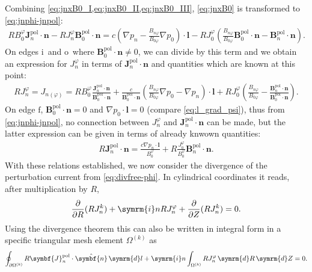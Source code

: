 \documentclass[a4paper, twoside, 10pt, english]{article}
\numberwithin{equation}{section}
\let\temp\varrho
\let\varrho\rho
\let\rho\temp
\let\temp\vartheta
\let\vartheta\theta
\let\theta\temp
\let\temp\varphi
\let\varphi\phi
\let\phi\temp
\let\vec\symbf
\newcommand*\grad{\ensuremath{\nabla}}
\newcommand*\diff{\ensuremath{\symrm{d}}}  %
\newcommand*\im{\ensuremath{\symrm{i}}}  %
\newcommand*\pd[2][]{\ensuremath{\frac{\partial #1}{\partial #2}}}  %
\newcommand*\pol{\ensuremath{\textrm{pol}}}  %
\newcommand*\fs{\ensuremath{\textrm{f}}}  %
\newcommand*\inw{\ensuremath{\textrm{i}}}  %
\newcommand*\out{\ensuremath{\textrm{o}}}  %
\begin{document}
Combining \cref{eq:jnxB0_I,eq:jnxB0_II,eq:jnxB0_III}, \cref{eq:jnxB0} is transformed to \cref{eq:jnphi-jnpol}:
\begin{gather}
  R B_{0}^{\phi} \vec{J}_{n}^{\pol} \cdot \vec{n} - R J_{n}^{\phi} \vec{B}_{0}^{\pol} \cdot \vec{n} = c \left ( \grad p_{n} - \frac{B_{n \phi}}{B_{0 \phi}} \grad p_{0} \right ) \cdot \vec{l} - R J_{0}^{\phi} \left ( \frac{B_{n \phi}}{B_{0 \phi}} \vec{B}_{0}^{\pol} \cdot \vec{n} - \vec{B}_{n}^{\pol} \cdot \vec{n} \right ). \label{eq:jnphi-jnpol}
\end{gather}
On edges \inw\ and \out\ where $\vec{B}_{0}^{\pol} \cdot \vec{n} \neq 0$, we can divide by this term and we obtain an expression for $J_{n}^{\phi}$ in terms of $\vec{J}_{n}^{\pol} \cdot \vec{n}$ and quantities which are known at this point:
\begin{gather}
  R J_{n}^{\phi} = J_{n (\phi)} = R B_{0}^{\phi} \frac{\vec{J}_{n}^{\pol} \cdot \vec{n}}{\vec{B}_{0}^{\pol} \cdot \vec{n}} + \frac{c}{\vec{B}_{0}^{\pol} \cdot \vec{n}} \left ( \frac{B_{n \phi}}{B_{0 \phi}} \grad p_{0} - \grad p_{n} \right ) \cdot \vec{l} + R J_{0}^{\phi} \left ( \frac{B_{n \phi}}{B_{0 \phi}} - \frac{\vec{B}_{n}^{\pol} \cdot \vec{n}}{\vec{B}_{0}^{\pol} \cdot \vec{n}} \right ). \label{eq:jnphi}
\end{gather}
On edge \fs, $\vec{B}_{0}^{\pol} \cdot \vec{n} = 0$ and $\grad p_{0} \cdot \vec{l} = 0$ (compare \cref{eq:l_grad_psi}), thus from \cref{eq:jnphi-jnpol}, no connection between $J_{n}^{\phi}$ and $\vec{J}_{n}^{\pol} \cdot \vec{n}$ can be made, but the latter expression can be given in terms of already knwown quantities:
\begin{gather}
  R \vec{J}_{n}^{\pol} \cdot \vec{n} = \frac{c \grad p_{n} \cdot \vec{l}}{B_{0}^{\phi}} + R \frac{J_{0}^{\phi}}{B_{0}^{\phi}} \vec{B}_{n}^{\pol} \cdot \vec{n}. \label{eq:If}
\end{gather}
With these relations established, we now consider the divergence of the perturbation current from \cref{eq:divfree-phi}. In cylindrical coordinates it reads, after multiplication by $R$,
\begin{gather}
  \pd{R} (R J_{n}^{k}) + \im n R J_{n}^{\phi} + \pd{Z} (R J_{n}^{k}) = 0.
\end{gather}
Using the divergence theorem this can also be written in integral form in a specific triangular mesh element $\Omega^{(k)}$ as
\begin{gather}
  \oint_{\partial \Omega^{(k)}} R \vec{J}_{n}^{\pol} \cdot \hat{\vec{n}} \, \diff l + \im n \int_{\Omega^{(k)}} R J_{n}^{\phi} \, \diff R \, \diff Z = 0.
\end{gather}
\end{document}
